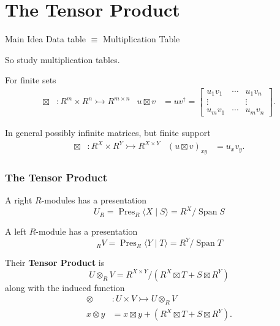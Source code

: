 \documentclass{beamer}
\DeclareMathOperator{\Span}{Span}
\DeclareMathOperator{\Pres}{Pres}
\newcommand{\bmto}{\rightarrowtail}
\begin{document}
\section{The Tensor Product}

\begin{frame}
    \begin{block}{Main Idea}
        \centering
    Data table $\equiv$ Multiplication Table
    \end{block}
\bigskip

    So study multiplication tables.
\end{frame}

\begin{frame}
    For finite sets 
    \begin{align*}
        \boxtimes & : R^m\times R^n \bmto R^{m\times n}
        &
        u\boxtimes v & = u v^{\dagger} = \begin{bmatrix} u_1 v_1 & \cdots & u_1 v_n \\ \vdots & & \vdots \\ u_m v_1 & \cdots & u_m v_n \end{bmatrix}.
    \end{align*}

    In general possibly infinite matrices, but finite support
    \begin{align*}
        \boxtimes & : R^X\times R^Y \bmto R^{X\times Y}
        &
        (u\boxtimes v)_{xy} & = u_x v_y.
    \end{align*}
\end{frame}

\begin{frame}
    \frametitle{The Tensor Product}

    A right $R$-modules has a presentation
    \[U_R=\Pres_R\langle X\mid S\rangle =R^X/\Span S\]

    A left $R$-module has a presentation
    \[{_R V}=\Pres_R\langle Y\mid T\rangle =R^Y/\Span T\]

    Their \textbf{Tensor Product} is
    \[ U\otimes_R V = R^{X\times Y}/(R^X\boxtimes T+S\boxtimes R^Y)\]
    along with the induced function 
    \begin{align*}
    \otimes & :U\times V \bmto U\otimes_R V
    \\
    x\otimes y & = x\boxtimes y+(R^X\boxtimes T+S\boxtimes R^Y).
    \end{align*}
\end{frame}
\end{document}
